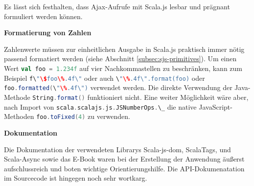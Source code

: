 \documentclass[a4paper, 12pt, hidelinks, listof=totoc, listoftables=totoc, bibliography=totoc]{scrreprt}
\newcommand{\scala}[1]{\lstinline[language=Scala, style=inline]|#1|}
\newcommand{\MyMiniSec}[1]{\rmfamily\fontsize{12}{15}\selectfont
	\vspace{7pt}\textbf{#1} %
}
\begin{document}
Es lässt sich festhalten, dass Ajax-Aufrufe mit Scala.js lesbar und prägnant formuliert werden können.


\MyMiniSec{Formatierung von Zahlen}

Zahlenwerte müssen zur einheitlichen Ausgabe in Scala.js praktisch immer nötig passend formatiert werden (siehe Abschnitt \ref{subsec:sjs-primitives}). Um einen Wert \scala{val foo = 1.234f} auf vier Nachkommastellen zu beschränken, kann zum Beispiel \scala{f\"\$foo\%.4f\"} oder auch \linebreak\mbox{\scala{\"\%.4f\".format(foo)}} oder \scala{foo.formatted(\"\%.4f\")} verwendet werden. Die direkte Verwendung der Java-Methode \scala{String.format()} funktioniert nicht. Eine weiter Möglichkeit wäre aber, nach Import von \scala{scala.scalajs.js.JSNumberOps.\_} die native JavaScript-Methoden \scala{foo.toFixed(4)} zu verwenden.


\MyMiniSec{Dokumentation}

Die Dokumentation der verwendeten Librarys Scala-js-dom, ScalaTags, und Scala-Async sowie das E-Book \cite[\#UsingWebServices]{haoyi.HOS} waren bei der Erstellung der Anwendung äußerst aufschlussreich und boten wichtige Orientierungshilfe. Die \ac{API}-Dokumenatation im Sourcecode ist hingegen noch sehr wortkarg.



%
\end{document}
